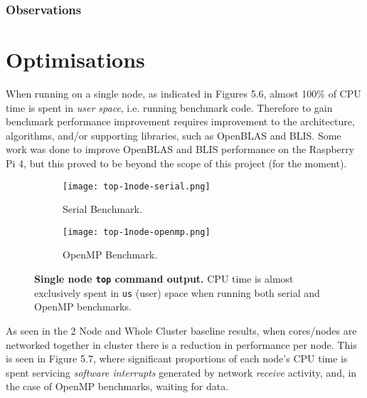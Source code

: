 \subsubsection{Observations}


%
%
\section{Optimisations}

When running on a single node, as indicated in Figures 5.6, almost 100\% of CPU time is spent in \emph{user space}, i.e. running benchmark code. Therefore to gain benchmark performance improvement requires improvement to the architecture, algorithms, and/or supporting libraries, such as OpenBLAS and BLIS. Some work was done to improve OpenBLAS and BLIS performance on the Raspberry Pi 4, but this proved to be beyond the scope of this project (for the moment). 

\begin{figure}[]
	\begin{subfigure}{1.0\textwidth}
		\centering
		\texttt{[image: top-1node-serial.png]}
		\caption{Serial Benchmark.}
		\label{fig:subim1}
	\end{subfigure}
	\par\bigskip
	\begin{subfigure}{1.0\textwidth}
		\centering
		\texttt{[image: top-1node-openmp.png]}
		\caption{OpenMP Benchmark.}
		\label{fig:subim2}
	\end{subfigure}
\caption{\textbf{Single node \texttt{top} command output.} CPU time is almost exclusively spent in \texttt{us} (user) space when running both serial and OpenMP benchmarks.}
\label{fig:image2}
\end{figure}

As seen in the 2 Node and Whole Cluster baseline results, when cores/nodes are networked together in cluster there is a reduction in performance per node. This is seen in Figure 5.7, where significant proportions of each node's CPU time is spent servicing \emph{software interrupts} generated by network \emph{receive} activity, and, in the case of OpenMP benchmarks, waiting for data.

